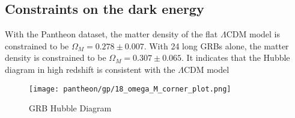\subsection{Constraints on the dark energy}
With the Pantheon dataset, the matter density of the flat $\Lambda$CDM model is constrained to be $\Omega_M=0.278 \pm 0.007$. With 24 long GRBs alone, the matter density is constrained to be $\Omega_M=0.307 \pm 0.065$. It indicates that the Hubble diagram in high redshift is consistent with the $\Lambda$CDM model
\begin{figure}[h]
	\centering
	\texttt{[image: pantheon/gp/18\_omega\_M\_corner\_plot.png]}
	\caption{GRB Hubble Diagram}
	\label{fig:OmegaM_GP}
\end{figure}

